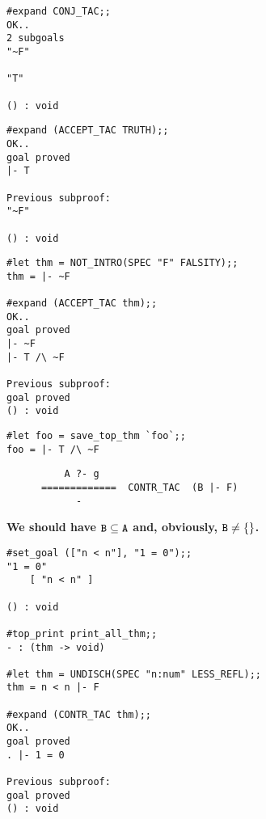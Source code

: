 \begin{session}\begin{verbatim}
#expand CONJ_TAC;;
OK..
2 subgoals
"~F"

"T"

() : void
\end{verbatim}\end{session}


\begin{session}\begin{verbatim}
#expand (ACCEPT_TAC TRUTH);;
OK..
goal proved
|- T

Previous subproof:
"~F"

() : void
\end{verbatim}\end{session}


\begin{session}\begin{verbatim}
#let thm = NOT_INTRO(SPEC "F" FALSITY);;
thm = |- ~F

#expand (ACCEPT_TAC thm);;
OK..
goal proved
|- ~F
|- T /\ ~F

Previous subproof:
goal proved
() : void
\end{verbatim}\end{session}

\begin{session}\begin{verbatim}
#let foo = save_top_thm `foo`;;
foo = |- T /\ ~F
\end{verbatim}\end{session}



\vskip7mm
{\Large\begin{verbatim}
          A ?- g
      =============  CONTR_TAC  (B |- F)
            -
\end{verbatim}}
\bpindent\LARGE\bf
We should have ${\tt B} \subseteq {\tt A}$ and, obviously, ${\tt B} \neq \{\}$.
\epindent

\vskip4mm
\begin{session}\begin{verbatim}
#set_goal (["n < n"], "1 = 0");;
"1 = 0"
    [ "n < n" ]

() : void

#top_print print_all_thm;;
- : (thm -> void)

#let thm = UNDISCH(SPEC "n:num" LESS_REFL);;
thm = n < n |- F

#expand (CONTR_TAC thm);;
OK..
goal proved
. |- 1 = 0

Previous subproof:
goal proved
() : void
\end{verbatim}\end{session}


